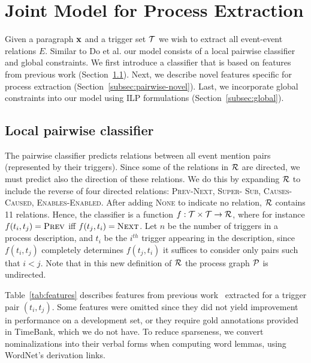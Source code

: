 \section{Joint Model for Process Extraction}

Given a paragraph $\mathbf{x}$ and a trigger set $\mathcal{T}$ we wish to extract all event-event relations $E$. Similar to Do et al.  our model consists of a local pairwise classifier and global constraints. We first introduce a classifier that is based on features from previous work (Section~\ref{subsec:pairwise}). Next, we describe novel features specific for process extraction (Section~\ref{subsec:pairwise-novel}). Last, we incorporate global constraints into our model using ILP formulations (Section~\ref{subsec:global}).

\subsection{Local pairwise classifier} \label{subsec:pairwise}

The pairwise classifier predicts relations between all event mention pairs (represented by their triggers). Since some of the relations in $\mathcal{R}$ are directed, we must predict also the direction of these relations. We do this by expanding $\mathcal{R}$ to include the reverse of four directed relations: \textsc{Prev}-\textsc{Next},  \textsc{Super}- \textsc{Sub}, \textsc{Causes}-\textsc{Caused}, \textsc{Enables}-\textsc{Enabled}. After adding \textsc{None} to indicate no relation, $\mathcal{R}$ contains 11 relations. Hence, the classifier is a function $f:\mathcal{T} \times \mathcal{T} \rightarrow \mathcal{R}$, where for instance $f(t_i,t_j)=\mbox{\textsc{Prev}}$ iff $f(t_j,t_i)=\mbox{\textsc{Next}}$. Let $n$ be the number of triggers in a process description, and $t_i$ be the $i^{th}$ trigger appearing in the description, since $f(t_i,t_j)$ completely determines $f(t_j,t_i)$ it suffices to consider only pairs such that $i<j$. Note that in this new definition of $\mathcal{R}$ the process graph $\mathcal{P}$ is undirected.

Table~\ref{tab:features} describes features from previous work~\cite{Chambers08,Do12} extracted for a trigger pair $(t_i,t_j)$. Some features were omitted since they did not yield improvement in performance on a development set, or they require gold annotations provided in TimeBank, which we do not have. To reduce sparseness, we convert nominalizations into their verbal forms when computing word lemmas, using WordNet's \cite{Fellbaum1998} derivation links.

